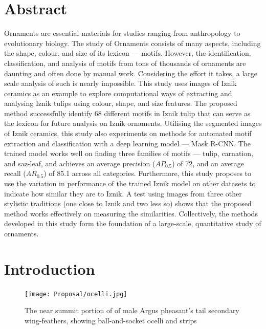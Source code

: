 \documentclass[11pt]{article}
\begin{document}
\section{Abstract}
Ornaments are essential materials for studies ranging from anthropology to evolutionary biology. The study of Ornaments consists of many aspects, including the shape, colour, and size of its lexicon --- motifs. However, the identification, classification, and analysis of motifs from tons of thousands of ornaments are daunting and often done by manual work. Considering the effort it takes, a large scale analysis of such is nearly impossible. This study uses images of Iznik ceramics as an example to explore computational ways of extracting and analysing Iznik tulips using colour, shape, and size features. The proposed method successfully identify 68 different motifs in Iznik tulip that can serve as the lexicon for future analysis on Iznik ornaments. Utilising the segmented images of Iznik ceramics, this study also experiments on methods for automated motif extraction and classification with a deep learning model --- Mask R-CNN. The trained model works well on finding three families of motifs --- tulip, carnation, and saz-leaf, and achieves an average precision ($AP_{0.5}$) of 72, and an average recall ($AR_{0.5}$) of 85.1 across all categories. Furthermore, this study proposes to use the variation in performance of the trained Iznik model on other datasets to indicate how similar they are to Iznik. A test using images from three other stylistic traditions (one close to Iznik and two less so) shows that the proposed method works effectively on measuring the similarities. Collectively, the methods developed in this study form the foundation of a large-scale, quantitative study of ornaments.
\newpage
\section{Introduction}

\begin{figure}
\texttt{[image: Proposal/ocelli.jpg]}
\caption{The near summit portion of of male Argus pheasant's tail secondary wing-feathers, showing ball-and-socket ocelli and strips}
\label{fig:ocelli}
\end{figure}
\end{document}
